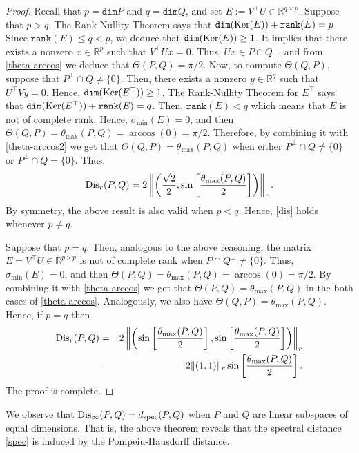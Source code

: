 \documentclass[hidelinks,onefignum,onetabnum]{siamart250211}
\theoremstyle{definition}
\theoremstyle{remark}
\newcommand{\R}{\mathbb R}
\newcommand{\Dis}{{\rm Dis}}
\begin{document}
\begin{proof}
Recall that $p=\mathtt{dim} P$ and $q=\mathtt{dim} Q$, and set $E:=V^\top U\in\R^{q\times p}$. Suppose that $p>q $. The Rank-Nullity Theorem says that $\mathtt{dim}({\rm Ker}(E))+\mathtt{rank}(E)=p$. Since $\mathtt{rank}(E)\leq q<p$, we deduce that $\mathtt{dim}({\rm Ker}(E))\geq 1$. It implies that there exists a nonzero $x\in\R^p$ such that $V^\top U x=0$. Thus, $Ux\in P\cap Q^\perp$, and from \eqref{theta-arccos} we deduce that $\Theta(P,Q)=\pi/2$. Now, to compute $\Theta(Q,P)$, suppose that $P^\perp\cap Q\neq\{0\}$. Then, there exists a nonzero $y\in\R^q$ such that $U^\top Vy=0$. Hence, $\mathtt{dim}({\rm Ker}(E^\top))\geq 1$. The Rank-Nullity Theorem for $E^\top$ says that $\mathtt{dim}({\rm Ker}(E^\top))+\mathtt{rank}(E)=q$. Then, $\mathtt{rank}(E)<q$ which means that $E$ is not of complete rank. Hence, $\sigma_{\min}(E)=0$, and then $\Theta(Q,P)=\theta_{\max}(P,Q)=\arccos(0)=\pi/2$. Therefore, by combining it with \eqref{theta-arccos2} we get that $\Theta(Q,P)=\theta_{\max}(P,Q)$ when either $P^\perp\cap Q\neq\{0\}$ or $P^\perp\cap Q=\{0\}$. Thus, 
\begin{equation}\label{dis}
\displaystyle {\rm Dis}_r(P,Q)= 2\left\Vert\left(\frac{\sqrt{2}}{2}, \sin\left[\frac{\theta_{\max}(P,Q)}{2}\right]\right)\right\Vert_r.
\end{equation}
By symmetry, the above result is also valid when $p<q$. Hence, \eqref{dis} holds whenever $p\neq q$.

Suppose that $p=q$. Then, analogous to the above reasoning, the matrix $E=V^\top U\in\R^{p\times p}$ is not of complete rank when $P\cap Q^\perp\neq\{0\}$. Thus, $\sigma_{\min}(E)=0$, and then $\Theta(P,Q)=\theta_{\max}(P,Q)=\arccos(0)=\pi/2$. By combining it with \eqref{theta-arccos} we get that $\Theta(P,Q)=\theta_{\max}(P,Q)$ in the both cases of \eqref{theta-arccos}. Analogously, we also have $\Theta(Q,P)=\theta_{\max}(P,Q)$. Hence, if $p=q$ then
\begin{eqnarray*}
\displaystyle {\rm Dis}_r(P,Q)&=& 2\left\Vert\left(\sin\left[\frac{\theta_{\max}(P,Q)}{2}\right], \sin\left[\frac{\theta_{\max}(P,Q)}{2}\right]\right)\right\Vert_r\\
&=&2\Vert(1,1)\Vert_r\sin\left[\frac{\theta_{\max}(P,Q)}{2}\right].
\end{eqnarray*}
The proof is complete.
\end{proof}

\begin{remark}
We observe that $\Dis_{\infty}(P,Q)=d_{\rm spec}(P,Q)$ when $P$ and $Q$ are linear subspaces of equal dimensions. That is, the above theorem reveals that the spectral distance \eqref{spec} is induced by the Pompeiu-Hausdorff distance.
\end{remark}
\end{document}
